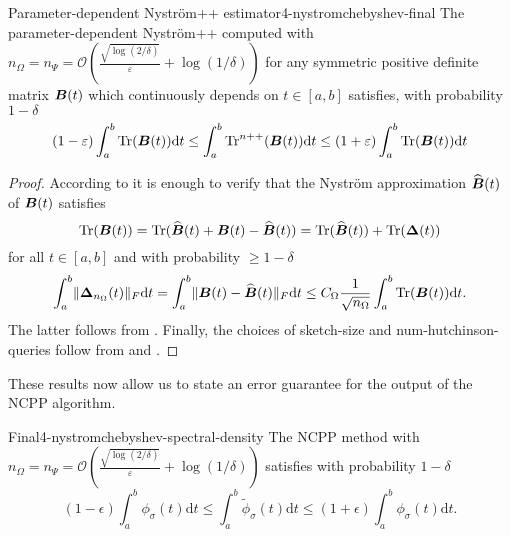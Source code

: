 \begin{theorem}{Parameter-dependent Nystr\"om++ estimator}{4-nystromchebyshev-final}
    The parameter-dependent Nystr\"om++ computed with
    $n_{\Omega} = n_{\Psi} = \mathcal{O}\left( \frac{\sqrt{\log(2/\delta)}}{\varepsilon} + \log(1/\delta) \right)$
    for any symmetric positive definite matrix $\boldsymbol{B}(t)$ which continuously
    depends on $t \in [a, b]$ satisfies, with probability
    $1 - \delta$
    \begin{equation}
        (1 - \varepsilon) \int_{a}^{b}\operatorname{Tr}(\boldsymbol{B}(t)) \mathrm{d}t \leq \int_{a}^{b}\operatorname{Tr}^{n++}(\boldsymbol{B}(t)) \mathrm{d}t \leq  (1 + \varepsilon) \int_{a}^{b}\operatorname{Tr}(\boldsymbol{B}(t)) \mathrm{d}t
    \end{equation}
\end{theorem}

\begin{proof}
    According to  it is enough to verify that the Nystr\"om approximation $\widehat{\boldsymbol{B}}(t)$ of $\boldsymbol{B}(t)$ satisfies
    \begin{equation}
        \operatorname{Tr}(\boldsymbol{B}(t)) = \operatorname{Tr}(\widehat{\boldsymbol{B}}(t) + \boldsymbol{B}(t) - \widehat{\boldsymbol{B}}(t)) = \operatorname{Tr}(\widehat{\boldsymbol{B}}(t)) + \operatorname{Tr}(\boldsymbol{\Delta}(t))
    \end{equation}
    for all $t \in [a, b]$ and with probability $\geq 1 - \delta$
    \begin{equation}
        \int_{a}^{b} \lVert \boldsymbol{\Delta}_{n_{\Omega}}(t) \rVert _F \mathrm{d}t = \int_{a}^{b} \lVert \boldsymbol{B}(t) - \widehat{\boldsymbol{B}}(t) \rVert _F \mathrm{d}t \leq C_{\Omega} \frac{1}{\sqrt{n_{\Omega}}} \int_{a}^{b} \operatorname{Tr}(\boldsymbol{B}(t)) \mathrm{d}t.
    \end{equation}
    The latter follows from . Finally, the choices of \gls{sketch-size} and \gls{num-hutchinson-queries} follow from  and .
\end{proof}

These results now allow us to state an error guarantee for the output of the
\gls{NCPP} algorithm.
\begin{theorem}{Final}{4-nystromchebyshev-spectral-density}
    The \gls{NCPP} method with $n_{\Omega} = n_{\Psi} = \mathcal{O}\left( \frac{\sqrt{\log(2/\delta)}}{\varepsilon} + \log(1/\delta) \right)$
     satisfies with probability $1 - \delta$
    \begin{equation}
        (1 - \epsilon) \int_{a}^{b} \phi_{\sigma}(t) \mathrm{d}t \leq \int_{a}^{b} \widetilde{\phi}_{\sigma}(t) \mathrm{d}t \leq (1 + \epsilon) \int_{a}^{b} \phi_{\sigma}(t) \mathrm{d}t.
    \end{equation}
\end{theorem}

